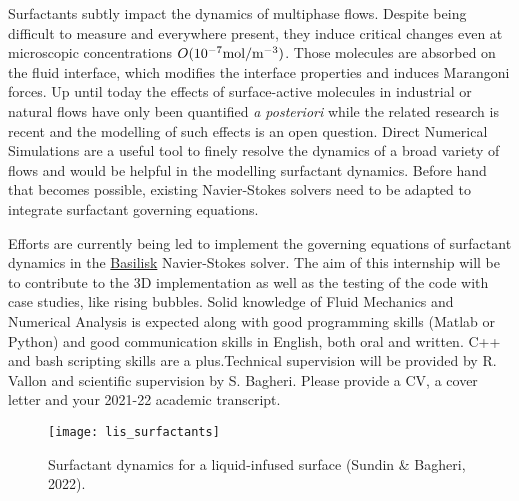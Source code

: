 \documentclass[letterpaper,11pt]{texMemo}
\begin{document}
\maketitle

Surfactants subtly impact the dynamics of multiphase flows. Despite being
difficult to measure and everywhere present, they induce critical changes even
at microscopic concentrations $O(10^{-7}\textnormal{mol}/\textnormal{m}^{-3})$.
Those molecules are absorbed on the fluid interface, which modifies the
interface properties and induces Marangoni forces. Up until today the effects of
surface-active molecules in industrial or natural flows have only been
quantified \textit{a posteriori} while the related research is recent and the
modelling of such effects is an open question.  Direct Numerical Simulations are
a useful tool to finely resolve the dynamics of a broad variety of flows and
would be helpful in the modelling surfactant dynamics. Before hand that becomes
possible, existing Navier-Stokes solvers need to be adapted to integrate
surfactant governing equations. 

Efforts are currently being led to implement the governing equations of
surfactant dynamics in the \href{www.basilisk.com}{Basilisk} Navier-Stokes
solver. The aim of this internship will be to contribute to the 3D
implementation as well as the testing of the code with case studies, like rising
bubbles. Solid knowledge of Fluid Mechanics and Numerical Analysis is expected
along with good programming skills (Matlab or Python) and good communication
skills in English, both oral and written. C++ and bash scripting skills are a
plus.Technical supervision will be provided by R. Vallon and scientific
supervision by S. Bagheri. Please provide a CV, a cover letter and your
2021-22 academic transcript.

\vfill
\begin{figure}[h]
  \centering
  \texttt{[image: lis\_surfactants]}
  \caption{Surfactant dynamics for a liquid-infused surface (Sundin \& Bagheri, 2022).}
\end{figure}
\vfill

\makekeywords
\cfoot{\thepage\ / \pageref{LastPage}}
\end{document}
